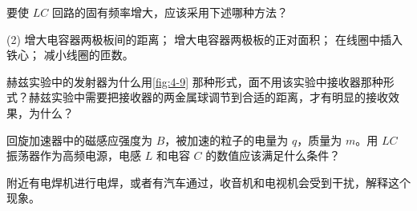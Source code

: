 \begin{Exercise}
\begin{question}
	\item 要使 $LC$ 回路的固有频率增大，应该采用下述哪种方法？
	\begin{tasks}(2)
		\task 增大电容器两极板间的距离；
		\task 增大电容器两极板的正对面积；
		\task 在线圈中插入铁心；
		\task 减小线圈的匝数。
	\end{tasks}
	\item 赫兹实验中的发射器为什么用\cref{fig:4-9} 那种形式，面不用该实验中接收器那种形式？赫兹实验中需要把接收器的两金属球调节到合适的距离，才有明显的接收效果，为什么？
	\item 回旋加速器中的磁感应强度为 $B$，被加速的粒子的电量为 $q$，质量为 $m$。用 $LC$ 振荡器作为高频电源，电感 $L$ 和电容 $C$ 的数值应该满足什么条件？
	\item 附近有电焊机进行电焊，或者有汽车通过，收音机和电视机会受到干扰，解释这个现象。
\end{question}
\end{Exercise}
